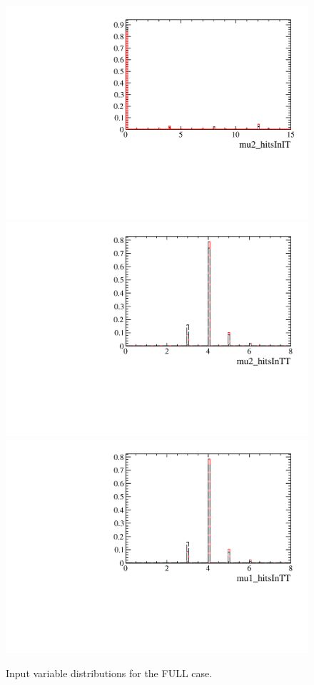 \begin{figure} [htb!]
\begin{center}
\includegraphics[scale=0.20]{figs/mu2_hitsInITFULL.pdf}
\includegraphics[scale=0.20]{figs/mu2_hitsInTTFULL.pdf}
\includegraphics[scale=0.20]{figs/mu1_hitsInTTFULL.pdf}
\caption{Input variable distributions for the FULL case. \label{fig:MVAhistos_FULL1}}
\end{center}
\end{figure}

